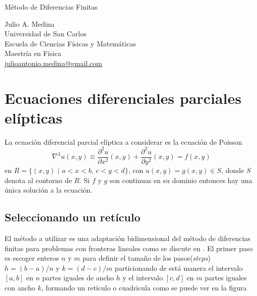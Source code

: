 \documentclass[a4paper]{article}
\begin{document}

\Large
 \begin{center}
Método de Diferencias Finitas\\


\hspace{10pt}

\large
Julio A. Medina\\
\hspace{10pt}
\small  
Universidad de San Carlos\\
Escuela de Ciencias Físicas y Matemáticas\\
Maestría en Física\\
\href{mailto:julioantonio.medina@gmail.com}{julioantonio.medina@gmail.com}\\

\end{center}

\hspace{10pt}

\normalsize
\section{Ecuaciones diferenciales parciales elípticas}
La ecuación diferencial parcial elíptica a considerar es la ecuación de Poisson
\begin{equation}\label{eq::Poisson}
\nabla^2 u(x,y)\equiv \frac{\partial^2 u}{\partial x^2}(x,y) + \frac{\partial^2 u}{\partial y^2}(x,y)=f(x,y)
\end{equation}
en $R=\{ (x,y)\,\,|\,\, a<x<b ,\, c<y<d \}$, con $u(x,y)=g(x,y) \in S$, donde $S$ denota al contorno de $R$. Si $f$ y $g$ son continuas en su dominio entonces hay una única solución a la ecuación.
\subsection{Seleccionando un retículo}
El método a utilizar es una adaptación bidimensional del método de diferencias finitas para problemas con fronteras lineales como se discute en \cite{Burden}. El primer paso es escoger enteros $n$ y $m$ para definir el tamaño de los pasos(\textit{steps}) $h=(b-a)/n$ y $k=(d-c)/m$ particionando de está manera el intervalo $[a,b]$ en $n$ partes iguales de ancho $h$ y el intervalo $[c,d]$ en $m$ partes iguales con ancho $k$, formando un retículo o cuadricula como se puede ver en la figura
\end{document}
